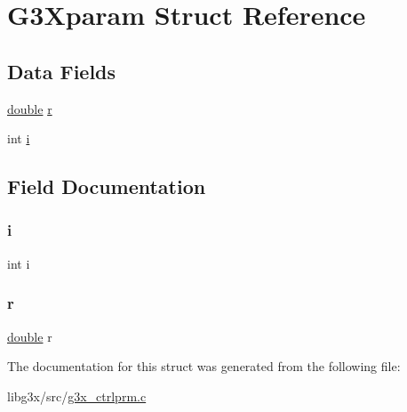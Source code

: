 \hypertarget{struct_g3_xparam}{}\section{G3\+Xparam Struct Reference}
\label{struct_g3_xparam}
\subsection*{Data Fields}
\begin{DoxyCompactItemize}
\item 
\hyperlink{g3x__transfo_8h_a89b2b23e407882a535d835574a7912e1}{double} \hyperlink{struct_g3_xparam_a880a49112fedae68e714341a9a082fb6}{r}
\item 
int \hyperlink{struct_g3_xparam_acb559820d9ca11295b4500f179ef6392}{i}
\end{DoxyCompactItemize}


\subsection{Field Documentation}
\mbox{\label{struct_g3_xparam_acb559820d9ca11295b4500f179ef6392}} 
\subsubsection{\texorpdfstring{i}{i}}
{\footnotesize\ttfamily int i}

\mbox{\label{struct_g3_xparam_a880a49112fedae68e714341a9a082fb6}} 
\subsubsection{\texorpdfstring{r}{r}}
{\footnotesize\ttfamily \hyperlink{g3x__transfo_8h_a89b2b23e407882a535d835574a7912e1}{double} r}



The documentation for this struct was generated from the following file\+:\begin{DoxyCompactItemize}
\item 
libg3x/src/\hyperlink{g3x__ctrlprm_8c}{g3x\+\_\+ctrlprm.\+c}\end{DoxyCompactItemize}
